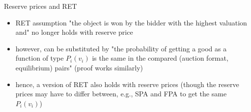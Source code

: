 \documentclass[bigger]{beamer}
\begin{document}
\begin{frame}[label={sec:org9ef106f}]{Reserve prices and RET}
\begin{itemize}
\item RET assumption "the object is won by the bidder with the highest valuation and" no longer holds with reserve price
\item however, can be substituted by "the probability of getting a good as a function of type \(P_i(v_i)\) is the same in the compared (auction format, equilibrium) pairs" \linebreak (proof works similarly)
\item hence, a version of RET also holds with reserve prices (though the reserve prices may have to differ between, e.g., SPA and FPA to get the same \(P_i(v_i)\))
\end{itemize}
\end{frame}
\end{document}
